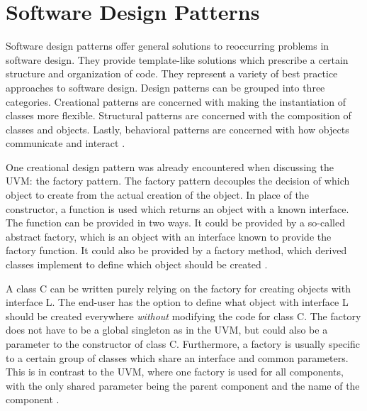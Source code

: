 
\section{Software Design Patterns} %



Software design patterns offer general solutions to reoccurring problems in software design. They provide
template-like solutions which prescribe a certain structure and organization of code. They represent a variety of
best practice approaches to software design. Design patterns can be grouped into three categories. Creational
patterns are concerned with making the instantiation of classes more flexible. Structural patterns are concerned with
the composition of classes and objects. Lastly, behavioral patterns are concerned with how objects communicate and
interact \cite[Ch. 1]{design_patterns}.

One creational design pattern was already encountered when discussing the UVM: the factory pattern. The factory
pattern decouples the decision of which object to create from the actual creation of the object. In place of the
constructor, a function is used which returns an object with a known interface. The function can be provided in two
ways. It could be provided by a so-called abstract factory, which is an object with an interface known to provide the
factory function. It could also be provided by a factory method, which derived classes implement to define which
object should be created \cite[Ch. 3]{design_patterns}.

A class C can be written purely relying on the factory for creating objects with interface L. The end-user has the
option to define what object with interface L should be created everywhere \textit{without} modifying the code for
class C. The factory does not have to be a global singleton as in the UVM, but could also be a parameter to the
constructor of class C. Furthermore, a factory is usually specific to a certain group of classes which share an
interface and common parameters. This is in contrast to the UVM, where one factory is used for all components, with
the only shared parameter being the parent component and the name of the component \cite[Ch. 3]{design_patterns}.

